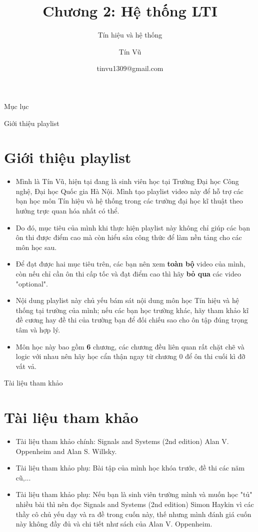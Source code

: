 \documentclass[8pt]{beamer}
\title[Chương 2: Hệ thống LTI] %
{Chương 2: Hệ thống LTI}
\subtitle{Tín hiệu và hệ thống}
\author[Tín hiệu và hệ thống] %
{Tín Vũ}
\date[VLC 2021] %
{tinvu1309@gmail.com}
\begin{document}
\frame{\titlepage}
\begin{frame}{Mục lục}
\tableofcontents
\end{frame}
\begin{frame}{Giới thiệu playlist}
\section{Giới thiệu playlist}
	\begin{itemize}
		\item Mình là Tín Vũ, hiện tại đang là sinh viên học tại Trường Đại học Công nghệ, Đại học Quốc gia Hà Nội. Mình tạo playlist video này để hỗ trợ các bạn học môn Tín hiệu và hệ thống trong các trường đại học kĩ thuật theo hướng \alert{trực quan hóa} nhất có thể.
		\item Do đó, mục tiêu của mình khi thực hiện playlist này không chỉ giúp các bạn ôn thi được điểm cao mà còn \alert{hiểu sâu công thức để làm nền tảng cho các môn học sau}.
		\item Để đạt được hai mục tiêu trên, các bạn nên xem \textbf{toàn bộ} video của mình, còn nếu chỉ cần ôn thi cấp tốc và đạt điểm cao thì hãy \textbf{bỏ qua} các video "optional".
		\item Nội dung playlist này chủ yếu bám sát nội dung môn học Tín hiệu và hệ thống tại trường của mình; nếu các bạn học trường khác, hãy tham khảo kĩ đề cương hay đề thi của trường bạn để đối chiếu sao cho ôn tập đúng trọng tâm và hợp lý. 
		\item Môn học này bao gồm \textbf{6} chương, các chương đều liên quan rất chặt chẽ và logic với nhau nên hãy học cẩn thận ngay từ \alert{chương 0} để ôn thi cuối kì đỡ vất vả.
	\end{itemize}
\end{frame}
\begin{frame}{Tài liệu tham khảo}
\section{Tài liệu tham khảo}
\begin{itemize}
		\item Tài liệu tham khảo chính: Signals and Systems (2nd edition) Alan V. Oppenheim and Alan S. Willsky.
		\item Tài liệu tham khảo phụ: Bài tập của mình học khóa trước, đề thi các năm cũ,...
		\item Tài liệu tham khảo phụ: Nếu bạn là sinh viên trường mình và muốn học "tủ" nhiều bài thì nên đọc Signals and Systems (2nd edition) Simon Haykin vì các thầy cô chủ yếu dạy và ra đề trong cuốn này, thế nhưng mình đánh giá cuốn này không đầy đủ và chi tiết như sách của Alan V. Oppenheim. 
	\end{itemize}
\end{frame}
\end{document}
